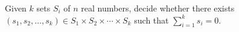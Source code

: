 \begin{problem}
	Given \(k\) sets \(S_i\) of \(n\) real numbers,
	decide whether there exists
	\((s_1, s_2, \ldots, s_k) \in S_1 \times S_2 \times \cdots \times S_k\)
	such that \(\sum_{i=1}^{k} s_i = 0 \).
\end{problem}

